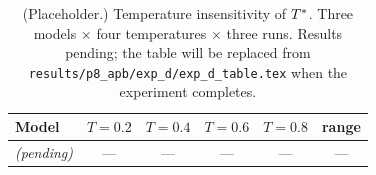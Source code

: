 \begin{table}[t]
\centering
\caption{(Placeholder.) Temperature insensitivity of $T^*$. Three models
$\times$ four temperatures $\times$ three runs. Results pending; the
table will be replaced from \texttt{results/p8\_apb/exp\_d/exp\_d\_table.tex}
when the experiment completes.}
\label{tab:exp_d_temperature}
\begin{tabular}{lccccc}
\toprule
Model & $T=0.2$ & $T=0.4$ & $T=0.6$ & $T=0.8$ & range \\
\midrule
\textit{(pending)} & --- & --- & --- & --- & --- \\
\bottomrule
\end{tabular}
\end{table}
